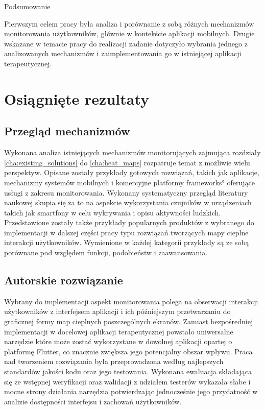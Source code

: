  \begin{chapter}{Podsumowanie}
	\newcommand{\chapterPath}{chapters/Summary}

	Pierwszym celem pracy była analiza i porównanie z sobą różnych mechanizmów monitorowania użytkowników, głównie w kontekście aplikacji mobilnych. Drugie wskazane w temacie pracy do realizacji zadanie dotyczyło wybrania jednego z analizowanych mechanizmów i zaimplementowania go w istniejącej aplikacji terapeutycznej. 
	
	\section{Osiągnięte rezultaty}
	
	\subsection{Przegląd mechanizmów}
	Wykonana analiza istniejących mechanizmów monitorujących zajmująca rozdziały \ref{cha:existing_solutions} do \ref{cha:heat_maps} rozpatruje temat z możliwie wielu perspektyw. Opisane zostały przykłady gotowych rozwiązań, takich jak aplikacje, mechanizmy systemów mobilnych i komercyjne platformy \ang{frameworks} oferujące usługi z zakresu monitorowania. Wykonany systematyczny przegląd literatury naukowej skupia się za to na aspekcie wykorzystania czujników w urządzeniach takich jak smartfony w celu wykrywania i opisu aktywności ludzkich. Przedstawione zostały także przykłady popularnych produktów z wybranego do implementacji w dalszej części pracy typu rozwiązań tworzących mapy cieplne interakcji użytkowników. Wymienione w każdej kategorii przykłady są ze sobą porównane pod względem funkcji, podobieństw i zaawansowania.
	
	\subsection{Autorskie rozwiązanie}
	Wybrany do implementacji aspekt monitorowania polega na obserwacji interakcji użytkowników z interfejsem aplikacji i ich późniejszym przetwarzaniu do graficznej formy map cieplnych poszczególnych ekranów. Zamiast bezpośredniej implementacji w docelowej aplikacji terapeutycznej powstało uniwersalne narzędzie które może zostać wykorzystane w dowolnej aplikacji opartej o platformę Flutter, co znacznie zwiększa jego potencjalny obszar wpływu. Praca nad tworzeniem rozwiązania była przeprowadzona według najlepszych standardów jakości kodu oraz jego testowania. Wykonana ewaluacja składająca się ze wstępnej weryfikacji oraz walidacji z udziałem testerów wykazała słabe i mocne strony działania narzędzia potwierdzając jednocześnie jego przydatność w analizie dostępności interfejsu i zachowań użytkowników.
	

\end{chapter}
